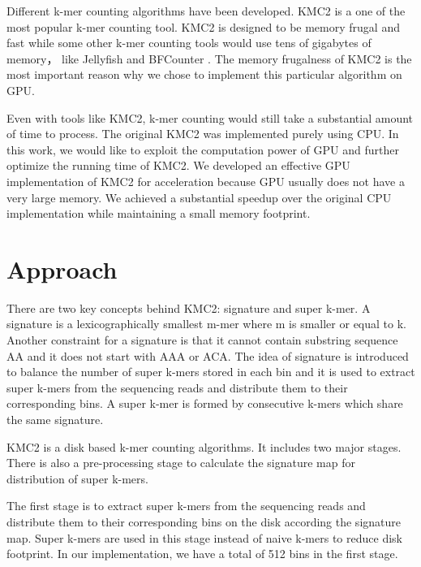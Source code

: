 \documentclass{bioinfo}
\begin{document}
Different k-mer counting algorithms have been developed.
KMC2 \citep{Seb14} is a one of the most popular k-mer counting tool. KMC2 is designed to be memory frugal and fast while some other k-mer counting tools would use tens of gigabytes of memory， like Jellyfish \citep{Mar11} and BFCounter \citep{Mel11}. 
The memory frugalness of KMC2 is the most important reason why we chose to implement this particular algorithm on GPU. 

Even with tools like KMC2, k-mer counting would still take a substantial amount of time to process. The original KMC2 was implemented purely using CPU. 
In this work, we would like to exploit the computation power of GPU and further optimize the running time of KMC2. We developed an effective GPU implementation of KMC2 for acceleration because GPU usually does not have a very large memory. 
We achieved a substantial speedup over the original CPU implementation while maintaining a small memory footprint.

\section{Approach}

There are two key concepts behind KMC2: signature and super k-mer.
A signature is a lexicographically smallest m-mer where m is smaller or equal to k. Another constraint for a signature is that it cannot contain substring sequence AA and it does not start with AAA or ACA.
The idea of signature is introduced to balance the number of super k-mers stored in each bin and it is used to extract super k-mers from the sequencing reads and distribute them to their corresponding bins.
A super k-mer is formed by consecutive k-mers which share the same signature.

KMC2 is a disk based k-mer counting algorithms. It includes two major stages. There is also a pre-processing stage to calculate the signature map for distribution of super k-mers.

The first stage is to extract super k-mers from the sequencing reads and distribute them to their corresponding bins on the disk according the signature map. 
Super k-mers are used in this stage instead of naive k-mers to reduce disk footprint.
In our implementation, we have a total of 512 bins in the first stage.
\end{document}
